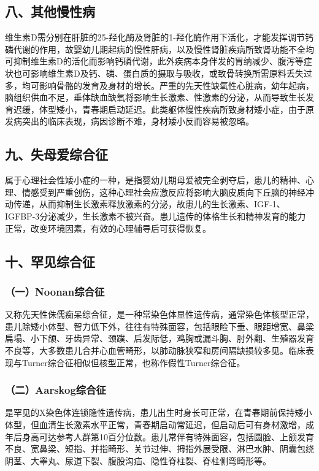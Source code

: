 \subsection{八、其他慢性病}

维生素D需分别在肝脏的25-羟化酶及肾脏的1-羟化酶作用下活化，才能发挥调节钙磷代谢的作用，故婴幼儿期起病的慢性肝病，以及慢性肾脏疾病所致肾功能不全均可抑制维生素D的活化而影响钙磷代谢，此外疾病本身伴发的胃纳减少、腹泻等症状也可影响维生素D及钙、磷、蛋白质的摄取与吸收，或致骨转换所需原料丢失过多，均可影响骨骼的发育及身材的增长。严重的先天性缺氧性心脏病，幼年起病，脑组织供血不足，垂体缺血缺氧将影响生长激素、性激素的分泌，从而导致生长发育迟缓，体型矮小，青春期启动延迟。此类躯体慢性疾病所致身材矮小症，由于原发病突出的临床表现，病因诊断不难，身材矮小反而容易被忽略。

\subsection{九、失母爱综合征}

属于心理社会性矮小症的一种，是指婴幼儿期母爱被完全剥夺后，患儿的精神、心理、情感受到严重创伤，这种心理社会应激反应将影响大脑皮质向下丘脑的神经冲动传递，从而抑制生长激素释放激素的分泌，故患儿的生长激素、IGF-1、IGFBP-3分泌减少，生长激素不被兴奋。患儿遗传的体格生长和精神发育的能力正常，改变环境因素，有效的心理辅导后可获得恢复。

\subsection{十、罕见综合征}

\subsubsection{（一）Noonan综合征}

又称先天性侏儒痴呆综合征，是一种常染色体显性遗传病，通常染色体核型正常，患儿除矮小体型、智力低下外，往往有特殊面容，包括眼睑下垂、眼距增宽、鼻梁扁塌、小下颌、牙齿异常、颈蹼、后发际低，鸡胸或漏斗胸、肘外翻、生殖器发育不良等，大多数患儿合并心血管畸形，以肺动脉狭窄和房间隔缺损较多见。临床表现与Turner综合征相似但核型正常，也称作假性Turner综合征。

\subsubsection{（二）Aarskog综合征}

是罕见的X染色体连锁隐性遗传病，患儿出生时身长可正常，在青春期前保持矮小体型，但血清生长激素水平正常，青春期启动常延迟，但启动后可有身材激增，成年后身高可达参考人群第10百分位数。患儿常伴有特殊面容，包括圆脸、上颌发育不良、宽鼻梁、短指、并指畸形、关节过伸、拇指外展受限、淋巴水肿、阴囊包绕阴茎、大睾丸、尿道下裂、腹股沟疝、隐性脊柱裂、脊柱侧弯畸形等。

